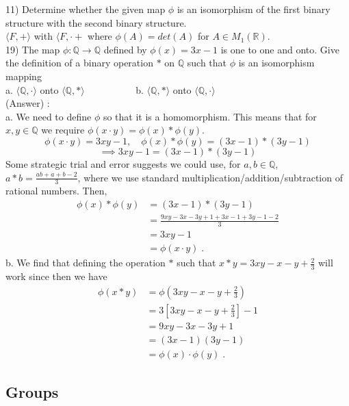 \documentclass[12pt, letterpaper]{article}
\begin{document}
11) Determine whether the given map $\phi$ is an isomorphism of the first binary structure with the second binary structure. \\

$\langle F, + \rangle$ with $\langle F, \cdot +$ where $\phi(A) = det(A)$ for $A \in M_1(\mathbb{R})$. \\

19) The map $\phi : \mathbb{Q} \rightarrow \mathbb{Q}$ defined by $\phi (x) = 3x - 1 $ is one to one and onto. Give the definition of a binary operation $*$ on $\mathbb{Q}$ such that $\phi$ is an isomorphism mapping \\

a. $\langle \mathbb{Q}, \cdot \rangle$ onto $\langle \mathbb{Q}, * \rangle \quad \quad \quad \quad \quad$ b. $\langle \mathbb{Q}, * \rangle$ onto $\langle \mathbb{Q}, \cdot \rangle$ \\

(Answer) : \\

a. We need to define $\phi$ so that it is a homomorphism. This means that for $x,y \in \mathbb{Q}$ we require $\phi(x \cdot y) = \phi(x) * \phi(y)$.
$$\phi(x\cdot y) = 3xy - 1, \quad \phi(x)*\phi(y) = (3x-1)*(3y-1)$$
$$\implies 3xy - 1 = (3x-1)*(3y-1)$$
Some strategic trial and error suggests we could use, for $a,b \in \mathbb{Q}$, $a*b = \frac{ab + a + b - 2}{3}$, where we use standard multiplication/addition/subtraction of rational numbers. Then, \begin{align*}
\phi(x)*\phi(y) &= (3x-1)*(3y-1)\\ &= \frac{9xy -3x -3y + 1 + 3x-1+3y-1 -2}{3}\\ &= 3xy - 1 \\ &= \phi(x\cdot y) \;.
\end{align*}
b. We find that defining the operation $*$ such that $x*y = 3xy - x - y + \frac{2}{3}$ will work since then we have \begin{align*}
\phi(x*y) &= \phi(3xy - x - y +\frac{2}{3}) \\
&= 3\left[3xy - x - y + \frac{2}{3} \right] - 1 \\
&= 9xy -3x -3y + 1 \\
&= (3x - 1) (3y - 1) \\
&= \phi(x) \cdot \phi(y) \;.
\end{align*}

\subsection{Groups}
\end{document}
